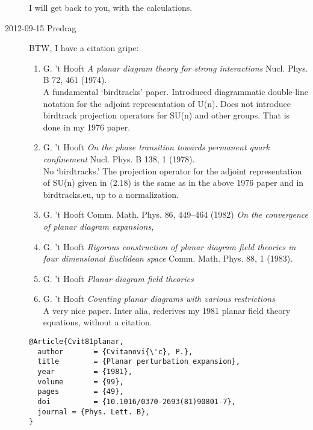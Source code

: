 \begin{description}
I will get back to you, with the calculations.

\item[2012-09-15 Predrag]
BTW, I have a citation gripe:
\begin{enumerate}

  \item
G. 't Hooft
{\emph{A planar diagram theory for strong interactions}}
Nucl. Phys. B 72, 461 (1974).\\
 A fundamental `birdtracks' paper.	Introduced diagrammatic double-line
 notation for the adjoint representation of U(n). Does not introduce
 birdtrack projection operators for SU(n) and other groups. That is done
 in my 1976 paper.

  \item
G. 't Hooft
{\emph{On the phase transition towards permanent quark confinement}}
 Nucl. Phys. B 138, 1 (1978).\\
No `birdtracks.'	The projection operator for the adjoint
representation of SU(n) given in (2.18) is the same as in the above 1976
paper and in  {birdtracks.eu}, up to
a normalization.	

  \item
G. 't Hooft
Comm. Math. Phys. {86}, {449--464} (1982)
{\emph{On the convergence of planar diagram expansions}},

  \item
 G. 't Hooft
{\emph{Rigorous construction of planar diagram field theories in four
       dimensional {Euclidean} space}}
 Comm. Math. Phys. {88}, 1 (1983). %

  \item
 G. 't Hooft
{{\em Planar diagram field theories}}

  \item
 G. 't Hooft
 {\emph{Counting planar diagrams with various restrictions}}\\
A very nice paper. Inter alia, rederives my 1981 planar field theory
 equations, without a citation.
\end{enumerate}

\begin{verbatim}
@Article{Cvit81planar,
  author       = {Cvitanovi{\'c}, P.},
  title        = {Planar perturbation expansion},
  year         = {1981},
  volume       = {99},
  pages        = {49},
  doi          = {10.1016/0370-2693(81)90801-7},
  journal = {Phys. Lett. B},
}


\end{verbatim}
\end{description}
